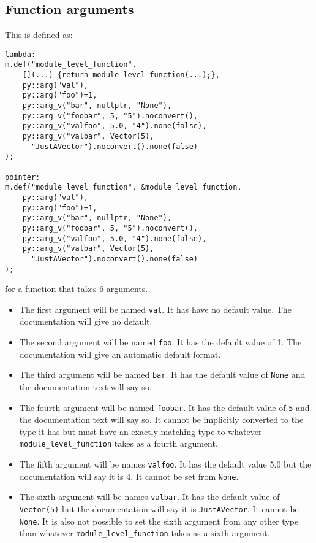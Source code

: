 \subsection{Function arguments}
This is defined as:
\begin{verbatim}
lambda:
m.def("module_level_function",
    [](...) {return module_level_function(...);},
    py::arg("val"),
    py::arg("foo")=1,
    py::arg_v("bar", nullptr, "None"),
    py::arg_v("foobar", 5, "5").noconvert(),
    py::arg_v("valfoo", 5.0, "4").none(false),
    py::arg_v("valbar", Vector(5),
      "JustAVector").noconvert().none(false)
);

pointer:
m.def("module_level_function", &module_level_function,
    py::arg("val"),
    py::arg("foo")=1,
    py::arg_v("bar", nullptr, "None"),
    py::arg_v("foobar", 5, "5").noconvert(),
    py::arg_v("valfoo", 5.0, "4").none(false),
    py::arg_v("valbar", Vector(5),
      "JustAVector").noconvert().none(false)
);
\end{verbatim}
for a function that takes 6 arguments.
\begin{itemize}
\item The first argument will be named \verb|val|.  It has have no default value.  The documentation will give no default.
\item The second argument will be named \verb|foo|.  It has the default value of 1.  The documentation will give an automatic default format.
\item The third argument will be named \verb|bar|.  It has the default value of \verb|None| and the documentation text will say so.
\item The fourth argument will be named \verb|foobar|.  It has the default value of \verb|5| and the documentation text will say so.  It cannot be implicitly converted to the type it has but must have an exactly matching type to whatever \verb|module_level_function| takes as a fourth argument.
\item The fifth argument will be names \verb|valfoo|.  It has the default value 5.0 but the documentation will say it is 4.  It cannot be set from \verb|None|.
\item The sixth argument will be names \verb|valbar|.  It has the default value of \verb|Vector(5)| but the documentation will say it is \verb|JustAVector|.  It cannot be \verb|None|.  It is also not possible to set the sixth argument from any other type than whatever \verb|module_level_function| takes as a sixth argument.
\end{itemize}

